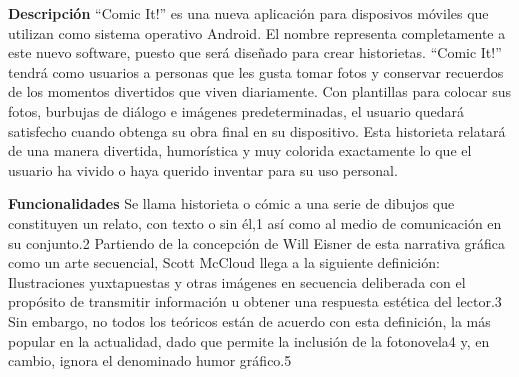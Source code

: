 \documentclass[12pt]{report}
\begin{document}
	\vspace{7mm}

\newpage

	\begingroup
		\large{
			\textbf{
				Descripción
				\newline
				\newline
			}
		}
	\endgroup
``Comic It!'' es una nueva aplicación para disposivos móviles que utilizan como sistema operativo Android. El nombre representa completamente a este nuevo software, puesto que será diseñado para crear historietas. ``Comic It!'' tendrá como usuarios a personas que les gusta tomar fotos y conservar recuerdos de los momentos divertidos que viven diariamente.
\newline
\newline
Con plantillas para colocar sus fotos, burbujas de diálogo e imágenes predeterminadas, el usuario quedará satisfecho cuando obtenga su obra final en su dispositivo. Esta historieta relatará de una manera divertida, humorística y muy colorida exactamente lo que el usuario ha vivido o haya querido inventar para su uso personal.
	\newline
	\newline
	\newline
	\newline



	\begingroup
		\large{
			\textbf{
				Funcionalidades
				\newline
				\newline
			}
		}
	\endgroup
Se llama historieta o cómic a una serie de dibujos que constituyen un relato, con texto o sin él,1 así como al medio de comunicación en su conjunto.2 Partiendo de la concepción de Will Eisner de esta narrativa gráfica como un arte secuencial, Scott McCloud llega a la siguiente definición: Ilustraciones yuxtapuestas y otras imágenes en secuencia deliberada con el propósito de transmitir información u obtener una respuesta estética del lector.3 Sin embargo, no todos los teóricos están de acuerdo con esta definición, la más popular en la actualidad, dado que permite la inclusión de la fotonovela4 y, en cambio, ignora el denominado humor gráfico.5
\newline
	\newline
	\newline
	\newline
\end{document}
